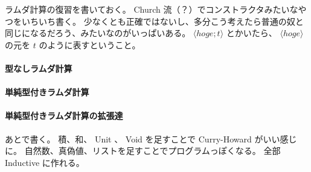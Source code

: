 ラムダ計算の復習を書いておく。
Church 流（？）でコンストラクタみたいなやつをいちいち書く。
少なくとも正確ではないし、多分こう考えたら普通の奴と同じになるだろう、みたいなのがいっぱいある。
\(\langle hoge ; t \rangle\) とかいたら、 \(\langle hoge \rangle\) の元を \(t\) のように表すということ。

\paragraph*{型なしラムダ計算}

\newpage

\paragraph*{単純型付きラムダ計算}

\newpage

\paragraph*{単純型付きラムダ計算の拡張達}
あとで書く。
積、和、 Unit 、 Void を足すことで Curry-Howard がいい感じに。
自然数、真偽値、リストを足すことでプログラムっぽくなる。
全部 Inductive に作れる。
